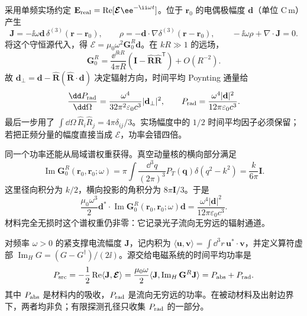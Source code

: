 \begin{exbox}[点电偶极与真空辐射功率]
采用单频实场约定 $\mathbf E_{\rm real}=\operatorname{Re}[\boldsymbol{\mathcal E}\ee^{-\ii\omega t}]$。位于 $\mathbf r_0$ 的电偶极幅度 $\mathbf d$（单位 $\mathrm{C\,m}$）产生
\begin{equation*}
 \mathbf J=-\ii\omega\mathbf d\,\delta^{(3)}(\mathbf r-\mathbf r_0),
 \qquad \rho=-\mathbf d\cdot\nabla\delta^{(3)}(\mathbf r-\mathbf r_0),
 \qquad -\ii\omega\rho+\nabla\cdot\mathbf J=0.
\end{equation*}
将这个守恒源代入，得 $\boldsymbol{\mathcal E}=\mu_0\omega^2\mathbf G_0^R\mathbf d$。在 $kR\gg1$ 的远场，
\begin{equation*}
 \mathbf G_0^R=\frac{\ee^{\ii kR}}{4\pi R}
 (\mathbf I-\hat{\mathbf R}\hat{\mathbf R}^{\mathsf T})+O(R^{-2}).
\end{equation*}
故 $\mathbf d_\perp=\mathbf d-\hat{\mathbf R}(\hat{\mathbf R}\cdot\mathbf d)$ 决定辐射方向，时间平均 Poynting 通量给
\begin{equation}
 \frac{\dd P_{\rm rad}}{\dd\Omega}
 =\frac{\omega^4}{32\pi^2\varepsilon_0c^3}|\mathbf d_\perp|^2,
 \qquad
 P_{\rm rad}=\frac{\omega^4|\mathbf d|^2}{12\pi\varepsilon_0c^3}.
 \label{eq:feqo-vacuum-dipole-radiation}
\end{equation}
最后一步用了 $\int\dd\Omega\,\hat R_i\hat R_j=4\pi\delta_{ij}/3$。实场幅度中的 $1/2$ 时间平均因子必须保留；若把正频分量的幅度直接当成 $\boldsymbol{\mathcal E}$，功率会错四倍。

同一个功率还能从局域谱权重获得。真空动量核的横向部分满足
\begin{equation*}
 \operatorname{Im}\mathbf G_0^R(\mathbf r_0,\mathbf r_0;\omega)
 =\pi\int\frac{\dd^3q}{(2\pi)^3}P_T(\mathbf q)\delta(q^2-k^2)
 =\frac{k}{6\pi}\mathbf I.
\end{equation*}
这里径向积分为 $k/2$，横向投影的角积分为 $8\pi\mathbf I/3$。于是
\begin{equation*}
 \frac{\mu_0\omega^3}{2}\mathbf d^*\cdot
 \operatorname{Im}\mathbf G_0^R(\mathbf r_0,\mathbf r_0;\omega)\mathbf d
 =\frac{\omega^4|\mathbf d|^2}{12\pi\varepsilon_0c^3}.
\end{equation*}
材料完全无损时这个谱权重仍非零：它记录光子流向无穷远的辐射通道。
\end{exbox}

\begin{proposition}
对频率 $\omega>0$ 的紧支撑电流幅度 $\mathbf J$，记内积为 $\langle\mathbf u,\mathbf v\rangle=\int\dd^3r\,\mathbf u^*\cdot\mathbf v$，并定义算符虚部 $\operatorname{Im}_{H}G=(G-G^\dagger)/(2\ii)$。源交给电磁系统的时间平均功率是
\begin{equation}
 P_{\rm src}=-\frac12\operatorname{Re}\langle\mathbf J,\boldsymbol{\mathcal E}\rangle
 =\frac{\mu_0\omega}{2}\langle\mathbf J,\operatorname{Im}_{H}\mathbf G^R\mathbf J\rangle
 =P_{\rm abs}+P_{\rm rad}.
 \label{eq:feqo-maxwell-power-balance}
\end{equation}
其中 $P_{\rm abs}$ 是材料内的吸收，$P_{\rm rad}$ 是流向无穷远的功率。在被动材料及出射边界下，两者均非负；有限探测孔径只收集 $P_{\rm rad}$ 的一部分。
\end{proposition}

